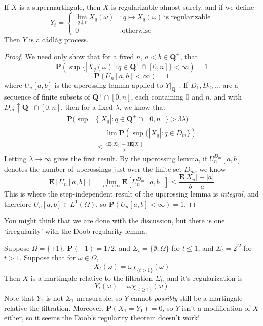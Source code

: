 \begin{theorem}
    If $X$ is a supermartingale, then $X$ is regularizable almost surely, and if we define
    \[ Y_t = \begin{cases} \lim_{q \downarrow t} X_q(\omega) & : q \mapsto X_q(\omega)\ \text{is regularizable} \\ 0 & : \text{otherwise} \end{cases} \]
    Then $Y$ is a c\'{a}dl\'{a}g process.
\end{theorem}
\begin{proof}
    We need only show that for a fixed $n$, $a < b \in \mathbf{Q}^+$, that
    \[ \mathbf{P}(\sup \{ |X_q(\omega)|: q \in \mathbf{Q}^+ \cap [0,n] \} < \infty) = 1 \]
    \[ \mathbf{P}(U_n[a,b] < \infty) = 1 \]
    where $U_n[a,b]$ is the upcrossing lemma applied to $Y|_{\mathbf{Q}^+}$. If $D_1, D_2, \dots$ are a sequence of finite subsets of $\mathbf{Q}^+ \cap [0,n]$, each containing $0$ and $n$, and with $D_m \uparrow \mathbf{Q}^+ \cap [0,n]$, then for a fixed $\lambda$, we know that
    \begin{align*}
        \mathbf{P}(\sup & \{ |X_q|: q \in \mathbf{Q}^+ \cap [0,n] \} > 3 \lambda)\\
        &= \lim \mathbf{P}(\sup \{ |X_q|: q \in D_m \})\\
        &\leq \frac{4 \mathbf{E} |X_0| + 3 \mathbf{E} |X_n|}{\lambda}
    \end{align*}
    Letting $\lambda \to \infty$ gives the first result. By the upcrossing lemma, if $U^{D_m}_n[a,b]$ denotes the number of upcrossings just over the finite set $D_m$, we know
    \[ \mathbf{E}[U_n[a,b]] = \lim_{m \to \infty} \mathbf{E}[U^{D_m}_n[a,b]] \leq \frac{\mathbf{E} |X_n| + |a|}{b-a} \]
    This is where the step-independent result of the upcrossing lemma is {\it integral}, and therefore $U_n[a,b] \in L^1(\Omega)$, so $\mathbf{P}(U_n[a,b] < \infty) = 1$.
\end{proof}

You might think that we are done with the discussion, but there is one `irregularity' with the Doob regularity lemma.

\begin{example}
    Suppose $\Omega = \{ \pm 1 \}$, $\mathbf{P}( \pm 1) = 1/2$, and $\Sigma_t = \{ \emptyset, \Omega \}$ for $t \leq 1$, and $\Sigma_t = 2^\Omega$ for $t > 1$. Suppose that for $\omega \in \Omega$,
    \[ X_t(\omega) = \omega \chi_{\{ t > 1 \}}(\omega) \]
    Then $X$ is a martingale relative to the filtration $\Sigma_t$, and it's regularization is
    \[ Y_t(\omega) = \omega \chi_{\{ t \geq 1 \}}(\omega) \]
    Note that $Y_1$ is not $\Sigma_1$ measurable, so $Y$ cannot {\it possibly} still be a martingale relative the filtration. Moreover, $\mathbf{P}(X_1 = Y_1) = 0$, so $Y$ isn't a modification of $X$ either, so it seems the Doob's regularity theorem doesn't work!
\end{example}

